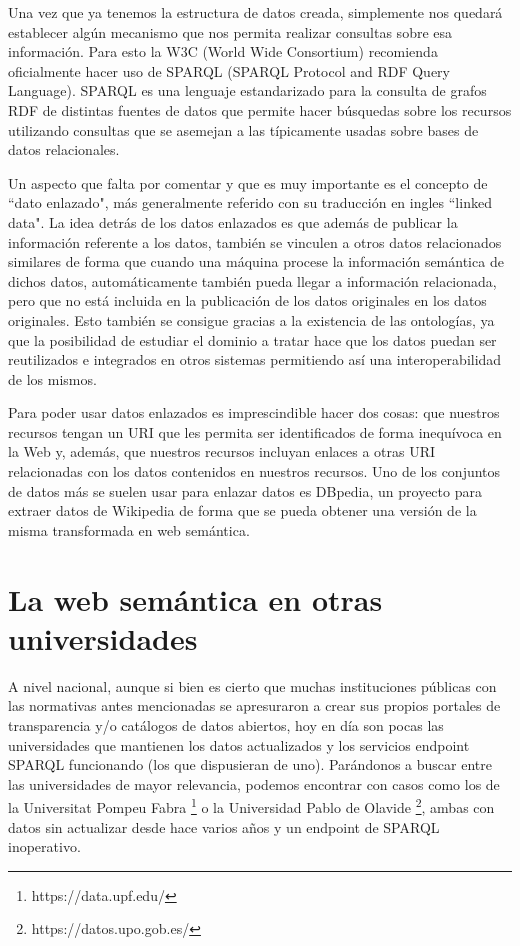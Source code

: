 \bigskip
Una vez que ya tenemos la estructura de datos creada, simplemente nos quedará establecer algún mecanismo que nos permita realizar consultas sobre esa información. Para esto la W3C (World Wide Consortium) recomienda oficialmente hacer uso de SPARQL (SPARQL Protocol and RDF Query Language). SPARQL es una lenguaje estandarizado para la consulta de grafos RDF de distintas fuentes de datos que permite hacer búsquedas sobre los recursos utilizando consultas que se asemejan a las típicamente usadas sobre bases de datos relacionales.

\bigskip

Un aspecto que falta por comentar y que es muy importante es el concepto de ``dato enlazado", más generalmente referido con su traducción en ingles ``linked data". La idea detrás de los datos enlazados es que además de publicar la información referente a los datos, también se vinculen a otros datos relacionados similares de forma que cuando una máquina procese la información semántica de dichos datos, automáticamente también pueda llegar a información relacionada, pero que no está incluida en la publicación de los datos originales en los datos originales. Esto también se consigue gracias a la existencia de las ontologías, ya que la posibilidad de estudiar el dominio a tratar hace que los datos puedan ser reutilizados e integrados en otros sistemas permitiendo así una interoperabilidad de los mismos.

\bigskip
Para poder usar datos enlazados es imprescindible hacer dos cosas: que nuestros recursos tengan un URI que les permita ser identificados de forma inequívoca en la Web y, además, que nuestros recursos incluyan enlaces a otras URI relacionadas con los datos contenidos en nuestros recursos. Uno de los conjuntos de datos más se suelen usar para enlazar datos es DBpedia, un proyecto para extraer datos de Wikipedia de forma que se pueda obtener una versión de la misma transformada en web semántica.

\newpage
\section{La web semántica en otras universidades}

A nivel nacional, aunque si bien es cierto que muchas instituciones públicas con las normativas antes mencionadas se apresuraron a crear sus propios portales de transparencia y/o catálogos de datos abiertos, hoy en día son pocas las universidades que mantienen los datos actualizados y los servicios endpoint SPARQL funcionando (los que dispusieran de uno). Parándonos a buscar entre las universidades de mayor relevancia, podemos encontrar con casos como los de la Universitat Pompeu Fabra \footnote{https://data.upf.edu/} o la Universidad Pablo de Olavide \footnote{https://datos.upo.gob.es/}, ambas con datos sin actualizar desde hace varios años y un endpoint de SPARQL inoperativo.

